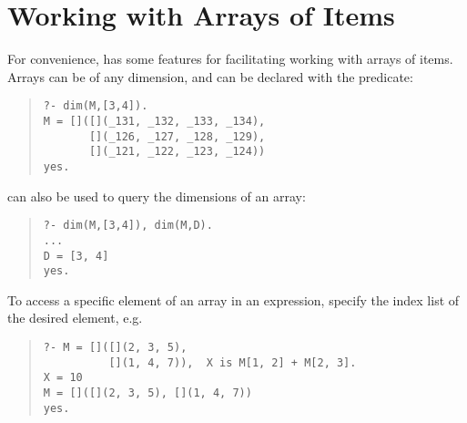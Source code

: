 

\section{Working with Arrays of Items}

For convenience, \eclipse{} has some features for facilitating working with
arrays of items.
Arrays can be of any dimension, and can be declared with the
predicate:
\begin{quote}\begin{verbatim}
?- dim(M,[3,4]).
M = []([](_131, _132, _133, _134),
       [](_126, _127, _128, _129),
       [](_121, _122, _123, _124))
yes.
\end{verbatim}\end{quote}
 can also be used to
query the dimensions of an array:
\begin{quote}\begin{verbatim}
?- dim(M,[3,4]), dim(M,D).
...
D = [3, 4]
yes.
\end{verbatim}\end{quote}


To access a specific element of an array in an expression, specify the index
list of the desired element, e.g.\
\begin{quote}\begin{verbatim}
?- M = []([](2, 3, 5),
          [](1, 4, 7)),  X is M[1, 2] + M[2, 3].
X = 10
M = []([](2, 3, 5), [](1, 4, 7))
yes.
\end{verbatim}\end{quote}


